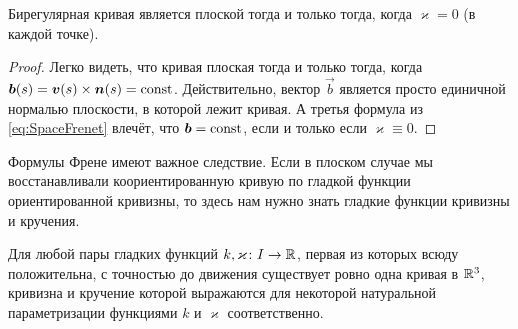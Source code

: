 \begin{proposition}
	Бирегулярная кривая является плоской тогда и только тогда, когда $\varkappa = 0$ (в каждой точке).
\end{proposition}

\begin{proof}
	Легко видеть, что кривая плоская тогда и только тогда, когда $\vec{b}(s) \hm= \vec{v}(s) \times \vec{n}(s) = \const$. Действительно, вектор $\vec{b}$ является просто единичной нормалью плоскости, в которой лежит кривая. А третья формула из \eqref{eq:SpaceFrenet} влечёт, что $\boldsymbol{b} = \mathrm{const}$, если и только если $\varkappa \equiv 0$.
\end{proof}

Формулы Френе имеют важное следствие. Если в плоском случае мы восстанавливали коориентированную кривую по гладкой функции ориентированной кривизны, то здесь нам нужно знать гладкие функции кривизны и кручения.

\begin{theorem} \label{theorem:FundamentalSpaceCurves}
	Для любой пары гладких функций $k, \varkappa\colon I \to \mathbb{R}$, первая из которых всюду положительна, с точностью до движения существует ровно одна кривая в $\mathbb{R}^3$, кривизна и кручение которой выражаются для некоторой натуральной параметризации функциями $k$ и $\varkappa$ соответственно.
\end{theorem}

